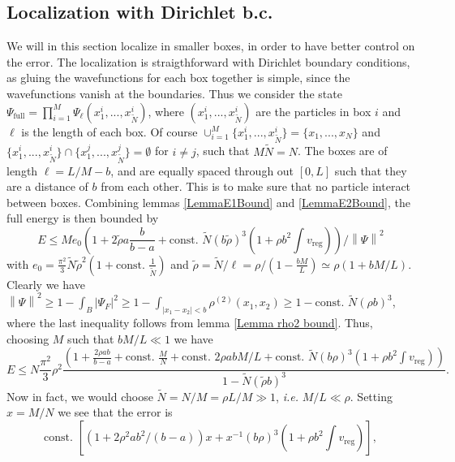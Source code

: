 \documentclass[a4paper,11pt]{article}
\newcommand{\norm}[1]{\left\lVert #1 \right\rVert}
\newcommand{\abs}[1]{\left\lvert #1 \right\rvert}
\newcommand{\ie}{\emph{i.e.} }
\numberwithin{equation}{section}
\begin{document}
	\subsection{Localization with Dirichlet b.c.}
	We will in this section localize in smaller boxes, in order to have better control on the error. The localization is straigthforward with Dirichlet boundary conditions, as gluing the wavefunctions for each box together is simple, since the wavefunctions vanish at the boundaries. Thus we consider the state $ \Psi_{\text{full}}=\prod_{i=1}^{M}\Psi_{\ell}(x^i_1,...,x^i_{\tilde{N}}) $, where $ (x_1^i,...,x_{\tilde{N}}^i) $ are the particles in box $ i $ and $ \ell $ is the length of each box. Of course $ \cup_{i=1}^{M}\{x_1^i,...,x_{\tilde{N}}^i\}=\{x_1,...,x_N\} $ and $ \{x_1^i,...,x_{\tilde{N}}^i\}\cap\{x_1^j,...,x_{\tilde{N}}^j\}=\emptyset $ for $ i\neq j $, such that $ M\tilde{N}=N $. The boxes are of length $ \ell=L/M-b $, and are equally spaced through out $ [0,L] $ such that they are a distance of $ b $ from each other. This is to make sure that no particle interact between boxes. Combining lemmas \ref{LemmaE1Bound} and \ref{LemmaE2Bound}, the full energy is then bounded by \begin{equation}
	E\leq M e_0\left(1+2\tilde{\rho} a\frac{b}{b-a} + \text{const. } \tilde{N} (b\tilde{\rho})^3\left(1+\rho b^2\int v_{\text{reg}}\right)\right)/\norm{\Psi}^2
	\end{equation}
	with $ e_0=\frac{\pi^2}{3}\tilde{N}\tilde{\rho}^2(1+\text{const. }\frac{1}{\tilde{N}}) $ and $ \tilde{\rho}=\tilde{N}/\ell=\rho/(1-\frac{bM}{L})\simeq\rho(1+bM/L) $. Clearly we have $ \norm{\Psi}^2\geq 1-\int_B\abs{\Psi_F}^2\geq 1-\int_{\abs{x_1-x_2}<b}\rho^{(2)}(x_1,x_2)\geq 1-\text{const. }\tilde{N}(\rho b)^3 $, where the last inequality follows from lemma \ref{Lemma rho2 bound}.
	Thus, choosing $ M $ such that $ bM/L\ll 1 $ we have \begin{equation}
	E\leq N\frac{\pi^2}{3}\rho^2\frac{\left(1+\frac{2\rho ab}{b-a}+\text{const. }\frac{M}{N}+\text{const. }2\rho abM/L+\text{const. }\tilde{N}(b\rho)^3\left(1+\rho b^2\int v_{\text{reg}}\right)\right)}{1-\tilde{N}(\tilde{\rho} b)^3}.
	\end{equation}
	Now in fact, we would choose $ \tilde{N}=N/M=\rho L/M\gg 1 $, \ie $ M/L\ll \rho $. Setting $ x=M/N $ we see that the error is \begin{equation}
	\text{const. }\left[(1+2\rho^2 ab^2/(b-a))x+x^{-1}(b\rho)^3\left(1+\rho b^2\int v_{\text{reg}}\right)\right],
	\end{equation}
\end{document}
